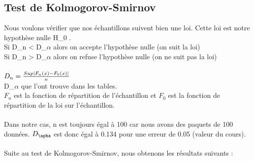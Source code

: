 \documentclass[a4paper,10pt]{article}
\begin{document}
\subsection{Test de Kolmogorov-Smirnov}
Nous voulons vérifier que nos échantillons suivent bien une loi. Cette loi est notre hypothèse nulle H_0 .
\\
Si D_n < D_$\alpha$ alors on accepte l'hypothèse nulle (on suit la loi)\\
Si D_n > D_$\alpha$ alors on refuse l'hypothèse nulle (on ne suit pas la loi)\\
\\
\begin{math}
 D_n = \frac{Sup|F_n (x)-F_0(x)|}{n}\\
\end{math}
\\
D_$\alpha$ que l'ont trouve dans les tables. \\
$F_n$ est la fonction de répartition de l'échantillon et $F_0$ est la fonction de répartition de la loi sur l'échantillon.\\
\\
Dans notre cas, n est toujours égal à 100 car nous avons des paquets de 100 données.
$D_\apha$ est donc égal à 0.134 pour une erreur de 0.05 (valeur du cours).\\
\\
Suite au test de Kolmogorov-Smirnov, nous obtenons les résultats suivants : \\
\\
\end{document}
